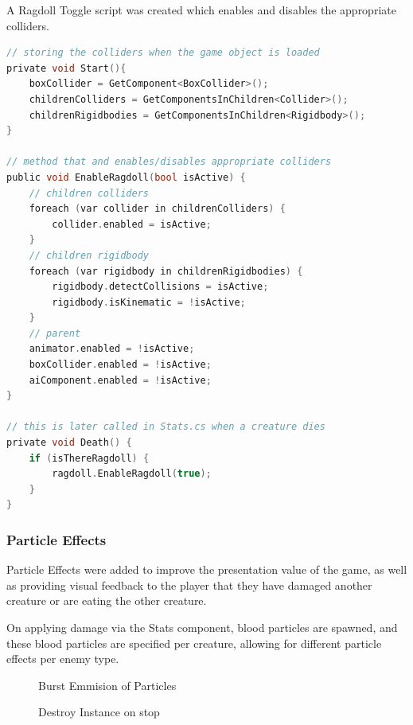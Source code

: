 \documentclass[11pt]{report}
\begin{document}
A Ragdoll Toggle script was created which enables and disables the appropriate colliders.

\begin{lstlisting}[language=c]
// storing the colliders when the game object is loaded
private void Start(){
    boxCollider = GetComponent<BoxCollider>();
    childrenColliders = GetComponentsInChildren<Collider>();
    childrenRigidbodies = GetComponentsInChildren<Rigidbody>();
}

// method that and enables/disables appropriate colliders
public void EnableRagdoll(bool isActive) {
    // children colliders
    foreach (var collider in childrenColliders) {
        collider.enabled = isActive;
    }
    // children rigidbody
    foreach (var rigidbody in childrenRigidbodies) {
        rigidbody.detectCollisions = isActive;
        rigidbody.isKinematic = !isActive;
    }
    // parent
    animator.enabled = !isActive;
    boxCollider.enabled = !isActive;
    aiComponent.enabled = !isActive;
}

// this is later called in Stats.cs when a creature dies
private void Death() {
    if (isThereRagdoll) {
        ragdoll.EnableRagdoll(true);
    }
}
\end{lstlisting}

\subsubsection{Particle Effects}
Particle Effects were added to improve the presentation value of the game, as well as providing visual feedback to the player that they have damaged another creature or are eating the other creature.

On applying damage via the Stats component, blood particles are spawned, and these blood particles are specified per creature, allowing for different particle effects per enemy type. 

\begin{figure}[H]
    \begin{minipage}{.5\textwidth}
        \centering
        \caption{Burst Emmision of Particles}
    \end{minipage}
    \begin{minipage}{.5\textwidth}
        \centering
        \caption{Destroy Instance on stop}
    \end{minipage}
\end{figure}
\end{document}
